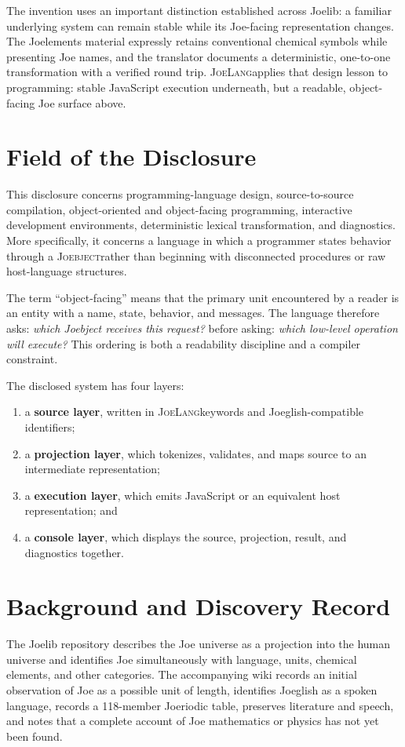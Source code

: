 \documentclass[12pt]{article}
\newcommand{\JoeLang}{\textsc{JoeLang}}
\newcommand{\Joebject}{\textsc{Joebject}}
\newcommand{\term}[1]{\textbf{#1}}
\begin{document}
The invention uses an important distinction established across Joelib: a familiar underlying system can remain stable while its Joe-facing representation changes. The Joelements material expressly retains conventional chemical symbols while presenting Joe names, and the translator documents a deterministic, one-to-one transformation with a verified round trip.\cite{joelements,translatorReadme,translatorSource} \JoeLang applies that design lesson to programming: stable JavaScript execution underneath, but a readable, object-facing Joe surface above.

\clearpage
\tableofcontents
\clearpage

\section{Field of the Disclosure}
This disclosure concerns programming-language design, source-to-source compilation, object-oriented and object-facing programming, interactive development environments, deterministic lexical transformation, and diagnostics. More specifically, it concerns a language in which a programmer states behavior through a \Joebject rather than beginning with disconnected procedures or raw host-language structures.

The term ``object-facing'' means that the primary unit encountered by a reader is an entity with a name, state, behavior, and messages. The language therefore asks: \emph{which Joebject receives this request?} before asking: \emph{which low-level operation will execute?} This ordering is both a readability discipline and a compiler constraint.

The disclosed system has four layers:
\begin{enumerate}
  \item a \term{source layer}, written in \JoeLang keywords and Joeglish-compatible identifiers;
  \item a \term{projection layer}, which tokenizes, validates, and maps source to an intermediate representation;
  \item a \term{execution layer}, which emits JavaScript or an equivalent host representation; and
  \item a \term{console layer}, which displays the source, projection, result, and diagnostics together.
\end{enumerate}

\clearpage
\section{Background and Discovery Record}
The Joelib repository describes the Joe universe as a projection into the human universe and identifies Joe simultaneously with language, units, chemical elements, and other categories.\cite{joelibReadme} The accompanying wiki records an initial observation of Joe as a possible unit of length, identifies Joeglish as a spoken language, records a 118-member Joeriodic table, preserves literature and speech, and notes that a complete account of Joe mathematics or physics has not yet been found.\cite{wikiHome}
\end{document}
